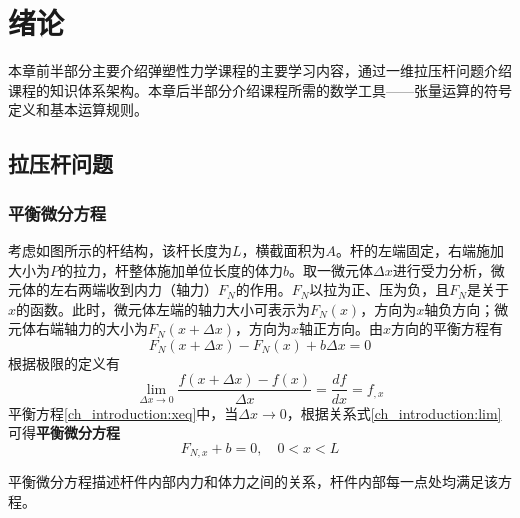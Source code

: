 \chapter{绪论}\label{introduction}

本章前半部分主要介绍弹塑性力学课程的主要学习内容，通过一维拉压杆问题介绍课程的知识体系架构。本章后半部分介绍课程所需的数学工具——张量运算的符号定义和基本运算规则。

\section{拉压杆问题}
\subsection{平衡微分方程}
考虑如图所示的杆结构，该杆长度为$L$，横截面积为$A$。杆的左端固定，右端施加大小为$P$的拉力，杆整体施加单位长度的体力$b$。取一微元体$\Delta x$进行受力分析，微元体的左右两端收到内力（轴力）$F_N$的作用。$F_N$以拉为正、压为负，且$F_N$是关于$x$的函数。此时，微元体左端的轴力大小可表示为$F_N(x)$，方向为$x$轴负方向；微元体右端轴力的大小为$F_N(x+\Delta x)$，方向为$x$轴正方向。由$x$方向的平衡方程有
\begin{equation} \label{ch_introduction:xeq}
F_N(x+\Delta x) - F_N(x) + b \Delta x = 0
\end{equation}
根据极限的定义有
\begin{equation} \label{ch_introduction:lim}
    \lim_{\Delta x \rightarrow 0} \frac{f(x+\Delta x) - f(x)}{\Delta x} = \frac{df}{dx} = f_{,x}
\end{equation}
平衡方程\eqref{ch_introduction:xeq}中，当$\Delta x \rightarrow 0$，根据关系式\eqref{ch_introduction:lim}可得\textbf{平衡微分方程}
\begin{equation}
    F_{N,x} + b = 0, \quad 0 < x < L
\end{equation} \par
平衡微分方程描述杆件内部内力和体力之间的关系，杆件内部每一点处均满足该方程。\par

